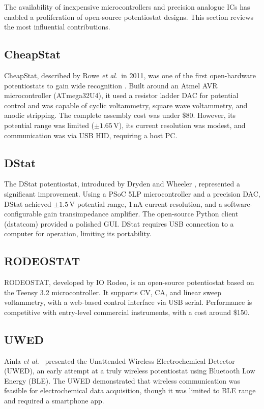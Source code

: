 The availability of inexpensive microcontrollers and precision analogue ICs has enabled a proliferation of open-source potentiostat designs. This section reviews the most influential contributions.

\subsection{CheapStat}

CheapStat, described by Rowe \textit{et al.}\ in 2011, was one of the first open-hardware potentiostats to gain wide recognition \cite{Rowe2011}. Built around an Atmel AVR microcontroller (ATmega32U4), it used a resistor ladder DAC for potential control and was capable of cyclic voltammetry, square wave voltammetry, and anodic stripping. The complete assembly cost was under \$80. However, its potential range was limited ($\pm 1.65$\,V), its current resolution was modest, and communication was via USB HID, requiring a host PC.

\subsection{DStat}

The DStat potentiostat, introduced by Dryden and Wheeler \cite{Dryden2015}, represented a significant improvement. Using a PSoC 5LP microcontroller and a precision DAC, DStat achieved $\pm 1.5$\,V potential range, 1\,nA current resolution, and a software-configurable gain transimpedance amplifier. The open-source Python client (dstatcom) provided a polished GUI. DStat requires USB connection to a computer for operation, limiting its portability.

\subsection{RODEOSTAT}

RODEOSTAT, developed by IO Rodeo, is an open-source potentiostat based on the Teensy 3.2 microcontroller. It supports CV, CA, and linear sweep voltammetry, with a web-based control interface via USB serial. Performance is competitive with entry-level commercial instruments, with a cost around \$150.

\subsection{UWED}

Ainla \textit{et al.}\ \cite{Ainla2018} presented the Unattended Wireless Electrochemical Detector (UWED), an early attempt at a truly wireless potentiostat using Bluetooth Low Energy (BLE). The UWED demonstrated that wireless communication was feasible for electrochemical data acquisition, though it was limited to BLE range and required a smartphone app.

